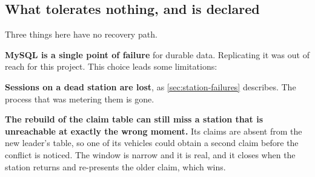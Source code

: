 \subsection{What tolerates nothing, and is declared}
\label{sec:no-tolerance}

Three things here have no recovery path.

\textbf{MySQL is a single point of failure} for durable data. Replicating it was
out of reach for this project. This choice leads some limitations:

\textbf{Sessions on a dead station are lost}, as \cref{sec:station-failures}
describes. The process that was metering them is gone.

\textbf{The rebuild of the claim table can still miss a station that is unreachable at exactly the
wrong moment.} Its claims are absent from the new leader's table, so one of its
vehicles could obtain a second claim before the conflict is noticed. The window
is narrow and it is real, and it closes when the station returns and re-presents
the older claim, which wins.
